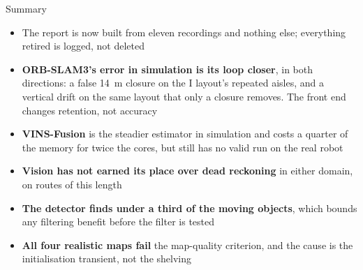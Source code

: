 \documentclass[11pt,aspectratio=169]{beamer}
\begin{document}
\begin{frame}{Summary}
  \footnotesize
  \begin{itemize}
    \item The report is now built from eleven recordings and nothing else;
          everything retired is logged, not deleted
    \item \textbf{ORB-SLAM3's error in simulation is its loop closer}, in both
          directions: a false \SI{14}{\metre} closure on the I layout's
          repeated aisles, and a vertical drift on the same layout that only a
          closure removes. The front end changes retention, not accuracy
    \item \textbf{VINS-Fusion} is the steadier estimator in simulation and
          costs a quarter of the memory for twice the cores, but still has no
          valid run on the real robot
    \item \textbf{Vision has not earned its place over dead reckoning} in
          either domain, on routes of this length
    \item \textbf{The detector finds under a third of the moving objects},
          which bounds any filtering benefit before the filter is tested
    \item \textbf{All four realistic maps fail} the map-quality criterion, and
          the cause is the initialisation transient, not the shelving
  \end{itemize}
\end{frame}
\end{document}

